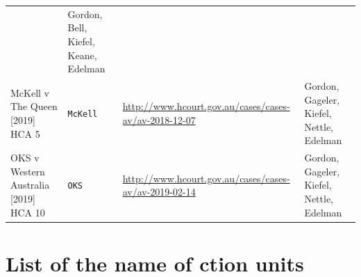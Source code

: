 \documentclass{monashthesis}
\begin{document}
\begin{longtable}[]{@{}llll@{}}
\begin{minipage}[t]{0.30\columnwidth}
\end{minipage} & \begin{minipage}[t]{0.22\columnwidth}\raggedright
Gordon, Bell, Kiefel, Keane, Edelman\strut
\end{minipage}\tabularnewline
\begin{minipage}[t]{0.22\columnwidth}\raggedright
McKell v The Queen {[}2019{]} HCA 5\strut
\end{minipage} & \begin{minipage}[t]{0.15\columnwidth}\raggedright
\texttt{McKell}\strut
\end{minipage} & \begin{minipage}[t]{0.30\columnwidth}\raggedright
\url{http://www.hcourt.gov.au/cases/cases-av/av-2018-12-07}\strut
\end{minipage} & \begin{minipage}[t]{0.22\columnwidth}\raggedright
Gordon, Gageler, Kiefel, Nettle, Edelman\strut
\end{minipage}\tabularnewline
\begin{minipage}[t]{0.22\columnwidth}\raggedright
OKS v Western Australia {[}2019{]} HCA 10\strut
\end{minipage} & \begin{minipage}[t]{0.15\columnwidth}\raggedright
\texttt{OKS}\strut
\end{minipage} & \begin{minipage}[t]{0.30\columnwidth}\raggedright
\url{http://www.hcourt.gov.au/cases/cases-av/av-2019-02-14}\strut
\end{minipage} & \begin{minipage}[t]{0.22\columnwidth}\raggedright
Gordon, Gageler, Kiefel, Nettle, Edelman\strut
\end{minipage}\tabularnewline
\bottomrule
\end{longtable}

\hypertarget{list-of-the-name-of-ction-units}{%
\section{List of the name of ction units}\label{list-of-the-name-of-ction-units}}
\end{document}
